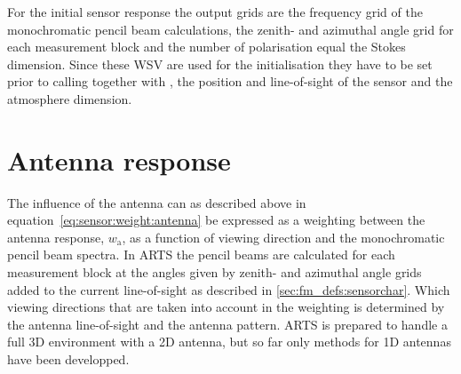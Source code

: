 For the initial sensor response the output grids are the frequency grid of the monochromatic pencil beam calculations, the zenith- and azimuthal angle grid for each measurement block and the number of polarisation equal the Stokes dimension. Since these WSV are used for the initialisation they have to be set prior to calling  together with , the position and line-of-sight of the sensor and the atmosphere dimension.


\section{Antenna response}
\label{sec:sensor:antenna}
The influence of the antenna can as described above in equation~\ref{eq:sensor:weight:antenna} be expressed as a weighting between the antenna response, $w_\mathrm{a}$, as a function of viewing direction and the monochromatic pencil beam spectra.
In ARTS the pencil beams are calculated for each measurement block at the angles
given by zenith- and azimuthal angle grids added to the current line-of-sight as described in \ref{sec:fm_defs:sensorchar}. Which viewing directions that are taken into account in the weighting is determined by the antenna line-of-sight and the antenna pattern. ARTS is prepared to handle a full 3D environment with a 2D antenna, but so far only methods for 1D antennas have been developped. 

